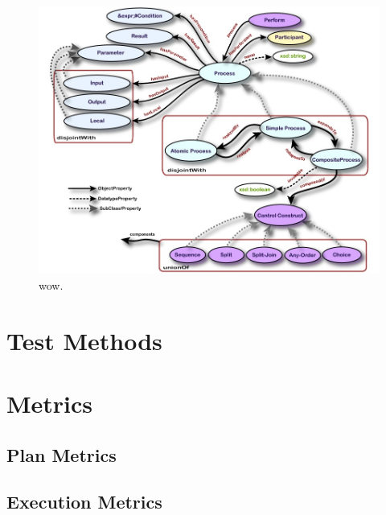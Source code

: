 \begin{figure}[htb]
\includegraphics[width=16cm]{images/OWL-S.jpg}
\caption{wow.}
\label{fig:ProcessDataFlow1}
\end{figure}



\section{Test Methods}
\label{sect:TestMethods}




\section{Metrics}
\subsection{Plan Metrics}
\label{sect:PlanMetrics}

\subsection{Execution Metrics}
\label{sect:ExecutionMetrics}





